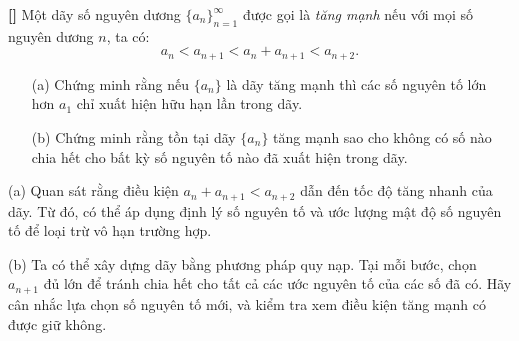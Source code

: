 \documentclass[../05-modular-arithmetic-a.tex]{subfiles}
\begin{document}
\begin{exercise*}\label{example:JPN-2015-MO-P3}\textbf{[]}
	Một dãy số nguyên dương \( \{a_n\}_{n=1}^{\infty} \) được gọi là \textit{tăng mạnh} nếu với mọi số nguyên dương \( n \), ta có:
	\[
		a_n < a_{n+1} < a_n + a_{n+1} < a_{n+2}.
	\]
	
	\begin{itemize}[topsep=0pt, partopsep=0pt, itemsep=0pt]
		\item[(a)] Chứng minh rằng nếu \( \{a_n\} \) là dãy tăng mạnh thì các số nguyên tố lớn hơn \( a_1 \) chỉ xuất hiện hữu hạn lần trong dãy.
		\item[(b)] Chứng minh rằng tồn tại dãy \( \{a_n\} \) tăng mạnh sao cho không có số nào chia hết cho bất kỳ số nguyên tố nào đã xuất hiện trong dãy.
	\end{itemize}
\end{exercise*}

\begin{remark*}
    (a) Quan sát rằng điều kiện \( a_n + a_{n+1} < a_{n+2} \) dẫn đến tốc độ tăng nhanh của dãy.
    Từ đó, có thể áp dụng định lý số nguyên tố và ước lượng mật độ số nguyên tố để loại trừ vô hạn trường hợp.

    (b) Ta có thể xây dựng dãy bằng phương pháp quy nạp. Tại mỗi bước, chọn \( a_{n+1} \) đủ lớn để tránh chia hết cho tất cả các ước nguyên tố của các số đã có.
    Hãy cân nhắc lựa chọn số nguyên tố mới, và kiểm tra xem điều kiện tăng mạnh có được giữ không.
\end{remark*}




\end{document}
